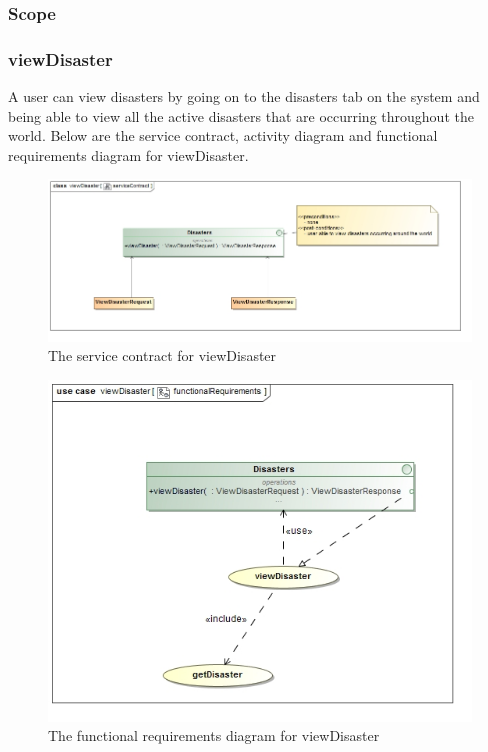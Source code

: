 \subsubsection{Scope}


\subsubsection{viewDisaster}

A user can view disasters by going on to the disasters tab on the system and being able to view all the active disasters that are occurring throughout the world. Below are the service contract, activity diagram and functional requirements diagram for viewDisaster.

\begin{figure}[H]
	\centering
	\includegraphics[width=1.0\textwidth]{../images/funcReq/viewDisasterServiceContract.jpg}
	\caption{The service contract for viewDisaster \label{overflow}}
\end{figure}

\begin{figure}[H]
	\centering
	\includegraphics[width=1.0\textwidth]{../images/funcReq/viewDisasterFunctionalRequirements.jpg}
	\caption{The functional requirements diagram for viewDisaster \label{overflow}}
\end{figure}

